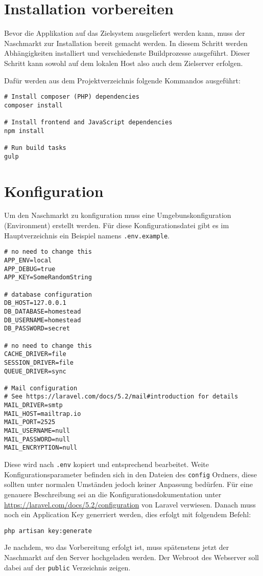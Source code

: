 \section{Installation vorbereiten}
Bevor die Applikation auf das Zielsystem ausgeliefert werden kann, muss der Naschmarkt zur Installation bereit gemacht werden.
In diesem Schritt werden Abh\"angigkeiten installiert und verschiedenste Buildprozesse ausgef\"uhrt.
Dieser Schritt kann sowohl auf dem lokalen Host also auch dem Zielserver erfolgen.

Daf\"ur werden aus dem Projektverzeichnis folgende Kommandos ausgef\"uhrt:
\begin{lstlisting}[caption=Installationsvorbereitung]
# Install composer (PHP) dependencies
composer install

# Install frontend and JavaScript dependencies
npm install

# Run build tasks
gulp
\end{lstlisting}

\section{Konfiguration}
Um den Naschmarkt zu konfiguration muss eine Umgebunskonfiguration (Environment) erstellt werden.
F\"ur diese Konfigurationsdatei gibt es im Hauptverzeichnis ein Beispiel namens \texttt{.env.example}.

\begin{lstlisting}[caption=Installationsvorbereitung]
# no need to change this
APP_ENV=local
APP_DEBUG=true
APP_KEY=SomeRandomString

# database configuration
DB_HOST=127.0.0.1
DB_DATABASE=homestead
DB_USERNAME=homestead
DB_PASSWORD=secret

# no need to change this
CACHE_DRIVER=file
SESSION_DRIVER=file
QUEUE_DRIVER=sync

# Mail configuration
# See https://laravel.com/docs/5.2/mail#introduction for details
MAIL_DRIVER=smtp
MAIL_HOST=mailtrap.io
MAIL_PORT=2525
MAIL_USERNAME=null
MAIL_PASSWORD=null
MAIL_ENCRYPTION=null
\end{lstlisting}
Diese wird nach \texttt{.env} kopiert und entsprechend bearbeitet.
Weite Konfigurationsparameter befinden sich in den Dateien des \texttt{config} Ordners, diese sollten unter normalen Umst\"anden jedoch keiner Anpassung bed\"urfen.
F\"ur eine genauere Beschreibung sei an die Konfigurationsdokumentation unter \url{https://laravel.com/docs/5.2/configuration} von Laravel verwiesen.
Danach muss noch ein Application Key generriert werden, dies erfolgt mit folgendem Befehl:

\begin{lstlisting}[caption=Installationsvorbereitung]
php artisan key:generate
\end{lstlisting}

Je nachdem, wo das Vorbereitung erfolgt ist, muss sp\"atenstens jetzt der Naschmarkt auf den Server hochgeladen werden.
Der Webroot des Webserver soll dabei auf der \texttt{public} Verzeichnis zeigen.

